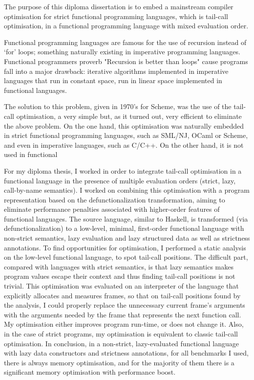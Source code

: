 \documentclass[diploma]{softlab-thesis}
\begin{document}
\begin{abstracten}%
  The purpose of this diploma dissertation is to embed a mainstream compiler optimisation 
  for strict functional programming languages, which is tail-call optimisation, in a functional 
  programming language with mixed evaluation order.

  Functional programming languages are famous for the use of recursion instead of `for' loops; 
  something naturally existing in imperative programming languages. Functional programmers proverb 
  "Recursion is better than loops" cause programs fall into a major drawback: iterative algorithms 
  implemented in imperative languages that run in constant space, run in linear space implemented 
  in functional languages. 
  
  The solution to this problem, given in 1970's for Scheme, was the use of the tail-call
  optimisation, a very simple but, as it turned out, very efficient to eliminate the above problem.
  On the one hand, this optimisation was naturally embedded in strict functional programming languages, such as 
  SML/NJ, OCaml or Scheme, and even in imperative languages, such as C/C++. On the other hand, it is not used in functional 

  For my diploma thesis, I worked in order to integrate tail-call optimisation in a functional 
  language in the presence of multiple evaluation orders (strict, lazy, call-by-name semantics). 
  I worked on combining this optimisation with a program representation based on the 
  defunctionalization transformation, aiming to eliminate performance penalties associated with 
  higher-order features of functional languages. The source language, similar to Haskell, 
  is transformed (via defunctionalization) to a low-level, minimal, first-order functional language 
  with non-strict semantics, lazy evaluation and lazy structured data as well as strictness 
  annotations. To find opportunities for optimisation, I performed a static analysis on the 
  low-level functional language, to spot tail-call positions. The difficult part, 
  compared with languages with strict semantics, is that lazy semantics makes program values escape 
  their context and thus finding tail-call positions is not trivial. This optimisation was evaluated
  on an interpreter of the language that explicitly allocates and measures frames, so that on 
  tail-call positions found by the analysis, I could properly replace the unnecessary current 
  frame's arguments with the arguments needed by the frame that represents the next function call. 
  My optimisation either improves program run-time, or does not change it. Also, in the case of 
  strict programs, my optimisation is equivalent to classic tail-call optimisation. In conclusion,
  in a non-strict, lazy-evaluated functional language with lazy data constructors and strictness 
  annotations, for all benchmarks I used, there is always memory optimisation, and for the majority 
  of them there is a significant memory optimisation with performance boost.


\end{abstracten}
\end{document}
